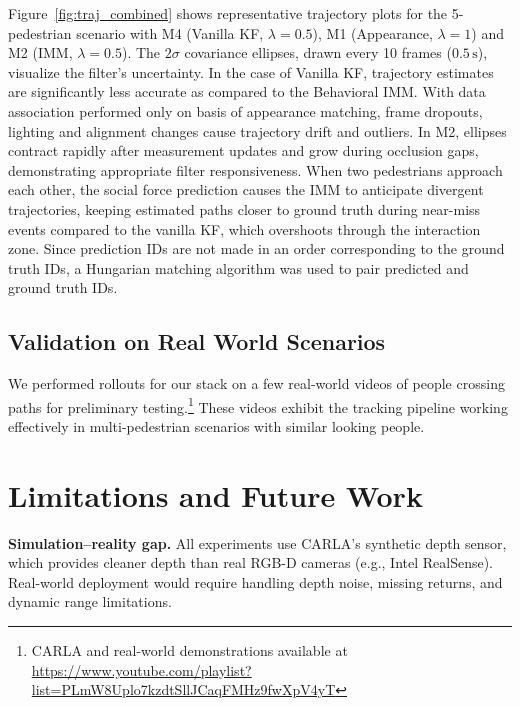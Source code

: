 \documentclass[conference]{IEEEtran}
\begin{document}
Figure~\ref{fig:traj_combined} shows representative trajectory plots for the 5-pedestrian scenario with M4 (Vanilla KF, $\lambda{=}0.5$), M1 (Appearance, $\lambda{=}1$) and M2 (IMM, $\lambda{=}0.5$). The $2\sigma$ covariance ellipses, drawn every 10 frames ($0.5\,\text{s}$), visualize the filter's uncertainty. In the case of Vanilla KF, trajectory estimates are significantly less accurate as compared to the Behavioral IMM. With data association performed only on basis of appearance matching, frame dropouts, lighting and alignment changes cause trajectory drift and outliers. In M2, ellipses contract rapidly after measurement updates and grow during occlusion gaps, demonstrating appropriate filter responsiveness. When two pedestrians approach each other, the social force prediction causes the IMM to anticipate divergent trajectories, keeping estimated paths closer to ground truth during near-miss events compared to the vanilla KF, which overshoots through the interaction zone. Since prediction IDs are not made in an order corresponding to the ground truth IDs, a Hungarian matching algorithm was used to pair predicted and ground truth IDs.


\subsection{Validation on Real World Scenarios}

We performed rollouts for our stack on a few real-world videos of people crossing paths for preliminary testing.\footnote{CARLA and real-world demonstrations available at \url{https://www.youtube.com/playlist?list=PLmW8Uplo7kzdtSllJCaqFMHz9fwXpV4yT}} These videos exhibit the tracking pipeline working effectively in multi-pedestrian scenarios with similar looking people.







\section{Limitations and Future Work}
\label{sec:limitations}

\textbf{Simulation--reality gap.} All experiments use CARLA's synthetic depth sensor, which provides cleaner depth than real RGB-D cameras (e.g., Intel RealSense). Real-world deployment would require handling depth noise, missing returns, and dynamic range limitations.
\end{document}
